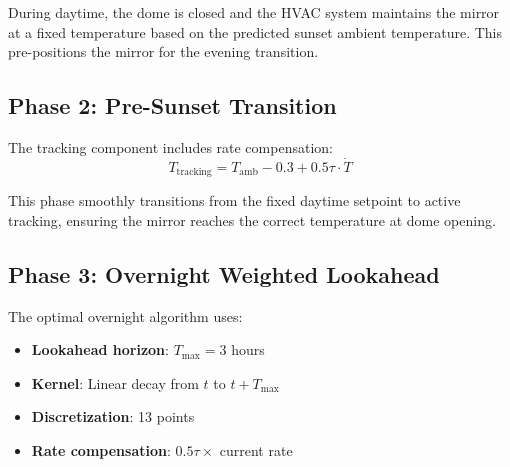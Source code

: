 \documentclass[11pt,letterpaper]{article}
\begin{document}
During daytime, the dome is closed and the HVAC system maintains the mirror at a fixed temperature based on the predicted sunset ambient temperature. This pre-positions the mirror for the evening transition.

\subsection{Phase 2: Pre-Sunset Transition}

\begin{center}
\end{center}

The tracking component includes rate compensation:
\begin{equation}
T_{\text{tracking}} = T_{\text{amb}} - 0.3 + 0.5\tau \cdot \dot{T}
\end{equation}

This phase smoothly transitions from the fixed daytime setpoint to active tracking, ensuring the mirror reaches the correct temperature at dome opening.

\subsection{Phase 3: Overnight Weighted Lookahead}

\begin{center}
\end{center}

The optimal overnight algorithm uses:
\begin{itemize}[noitemsep]
    \item \textbf{Lookahead horizon}: $T_{\max} = 3$ hours
    \item \textbf{Kernel}: Linear decay from $t$ to $t + T_{\max}$
    \item \textbf{Discretization}: 13 points
    \item \textbf{Rate compensation}: $0.5\tau \times$ current rate
\end{itemize}
\end{document}
